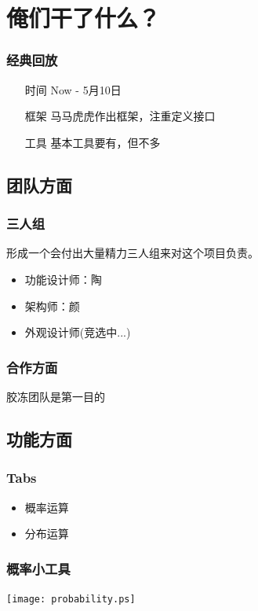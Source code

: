 \documentclass[dvipdfm,serif,mathserif]{beamer}
\begin{document}
\section{俺们干了什么？}

\begin{frame}
  \frametitle{经典回放}
\begin{itemize}
 \item[时间] Now -  5月10日
 \item[框架] 马马虎虎作出框架，注重定义接口
 \item[工具] 基本工具要有，但不多
\end{itemize}
\end{frame}

\subsection{团队方面}

\begin{frame}
  \frametitle{三人组}
形成一个会付出大量精力三人组来对这个项目负责。
\begin{itemize}
 \item 功能设计师：陶
\item 架构师：颜
\item 外观设计师(竞选中...)
\end{itemize}
\end{frame}

\begin{frame}
  \frametitle{合作方面}
\begin{center}
 \item 胶冻团队是第一目的
\end{center}
\end{frame}

\subsection{功能方面}

\begin{frame}
  \frametitle{Tabs}
\begin{itemize}
 \item 概率运算
\item 分布运算
\end{itemize}
\end{frame}


\begin{frame}
  \frametitle{概率小工具}
  \texttt{[image: probability.ps]}
\end{frame}
\end{document}
